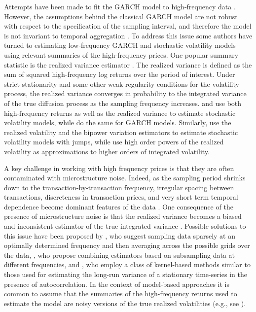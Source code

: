 Attempts have been made to fit the GARCH model to high-frequency data
\citep{bollerslev1986,andersen1997intraday}.  However, the assumptions
behind the classical GARCH model are not robust with respect to the
specification of the sampling interval, and therefore the model is not
invariant to temporal aggregation \citep{drost1993aggregation,
  andersen1997intraday, zumbach2000pitfalls}.  To address this issue
some authors have turned to estimating low-frequency GARCH and
stochastic volatility models using relevant summaries of the
high-frequency prices. One popular summary statistic is the realized
variance estimator \citep{comte1998long, andersen2001distribution,
  barndorff2002estimating}.  The realized variance is defined as the
sum of squared high-frequency log returns over the period of interest.
Under strict stationarity and some other weak regularity conditions
for the volatility process, the realized variance converges in
probability to the integrated variance of the true diffusion process
as the sampling frequency increases.  \cite{takahashi2009estimating}
and \cite{shirota2014realized} use both high-frequency returns as well
as the realized variance to estimate stochastic volatility models,
while \cite{hansen2012realized} do the same for GARCH models.
Similarly, \cite{maneesoonthorn2014inference} use the realized
volatility and the bipower variation estimators to estimate stochastic
volatility models with jumps, while \cite{bollerslev2002estimating}
use high order powers of the realized volatility as approximations to
higher orders of integrated volatility.

A key challenge in working with high frequency prices is that they are
often contaminated with microstructure noise. Indeed, as the sampling
period shrinks down to the transaction-by-transaction frequency,
irregular spacing between transactions, discreteness in transaction
prices, and very short term temporal dependence become dominant
features of the data \citep{stoll2000presidential}.  One consequence
of the presence of microstructure noise is that the realized variance
becomes a biased and inconsistent estimator of the true integrated
variance \citep{zhou1996high}.  Possible solutions to this issue have
been proposed by \cite{zhang2005tale}, who suggest sampling data
sparsely at an optimally determined frequency and then averaging
across the possible grids over the data, \cite{ait2011ultra}, who
propose combining estimators based on subsampling data at different
frequencies, and \cite{hansen2006realized, barndorff2008designing},
who employ a class of kernel-based methods similar to those used for
estimating the long-run variance of a stationary time-series in the
presence of autocorrelation. In the context of model-based approaches
it is common to assume that the summaries of the high-frequency
returns used to estimate the model are noisy versions of the true
realized volatilities (e.g., see \cite{venter2012extended,
  shirota2014realized}).

